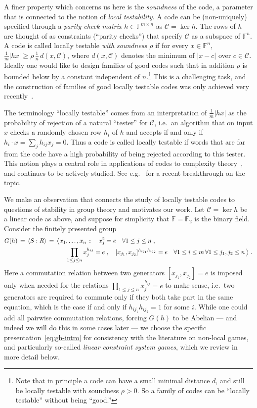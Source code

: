 \documentclass[11pt]{article}
\theoremstyle{definition}
\newcommand{\code}{\mathscr{C}}
\newcommand{\F}{\ensuremath{\mathbb{F}}}
\begin{document}
A finer property which concerns us here is the \emph{soundness} of the code, a parameter that is connected to the notion of \emph{local testability}. A code can be (non-uniquely) specified through a \emph{parity-check matrix} $h\in\F^{m\times n}$ as $\code = \ker h$. The rows of $h$ are thought of as constraints (``parity checks'') that specify $\code$ as a subspace of $\F^n$. A code is called locally testable \emph{with soundness $\rho$} if for every $x\in \F^n$, $\frac{1}{m}|hx|\geq \rho \, \frac{1}{n}\, d(x,\code)$, where $d(x,\code)$ denotes the minimum of $|x-c|$ over $c\in \code$.  Ideally one would like to design families of good codes such that in addition $\rho$ is bounded below by a constant independent of $n$.\footnote{Note that in principle a code can have a small minimal distance $d$, and still be locally testable with soundness $\rho>0$. So a family of codes can be ``locally testable'' without being ``good.''} This is a challenging task, and the construction of families of good locally testable codes was only achieved very recently~\cite{LTC_DELLM,LTC_Panteleev_Kalachev}. 

The terminology ``locally testable'' comes from an interpretation of $\frac{1}{m}|hx|$ as the probability of rejection of a natural ``tester'' for $\code$, i.e.\ an algorithm that on input $x$ checks a randomly chosen row $h_i$ of $h$ and accepts if and only if $h_i\cdot x = \sum_j h_{ij} x_j =0$.  Thus a code is called locally testable if words that are far from the code have a high probability of being rejected according to this tester. This notion plays a central role in applications of codes to complexity theory~\cite{babai1991non,PCP_thm}, and continues to be actively studied. See e.g.~\cite{LTC_DELLM,LTC_Panteleev_Kalachev} for a recent breakthrough on the topic. 

We make an observation that connects the study of locally testable codes to questions of stability in group theory and motivates our work. Let $\code=\ker h$ be a linear code as above, and suppose for simplicity that $\F=\F_2$ is the binary field. Consider the finitely presented group 
\begin{align}
 G(h) \,=\, \langle S:R\rangle \,=\, \big\langle &x_1,\ldots,x_n \,:\quad  x_j^2=e\quad \forall 1\leq j\leq n\;,\notag\\
& \quad \prod_{1\leq j \leq n} x_j^{h_{ij}} = e\;,\quad [x_{j_1},x_{j_2}]^{h_{ij_1} h_{ij_2}}=e\quad \forall 1\leq i\leq m\,\forall 1\leq j_1,j_2\leq n\,\big\rangle\;.\label{eq:gh-intro}
\end{align}
Here a commutation relation between two generators  $[x_{j_1},x_{j_2}]=e$ is imposed only when needed for the relations $\prod_{1\leq j \leq n} x_j^{h_{ij}} = e$ to make sense, i.e.\ two generators are required to commute only if they both take part in the same equation, which is the case if and only if $h_{ij_1}h_{ij_2}=1$ for some $i$. While one could add all pairwise commutation relations, forcing $G(h)$ to be Abelian --- and indeed we will do this in some cases later --- we choose the specific presentation~\eqref{eq:gh-intro} for consistency with the literature on non-local games, and particularly so-called \emph{linear constraint system games}, which we review in more detail below. 
\end{document}

